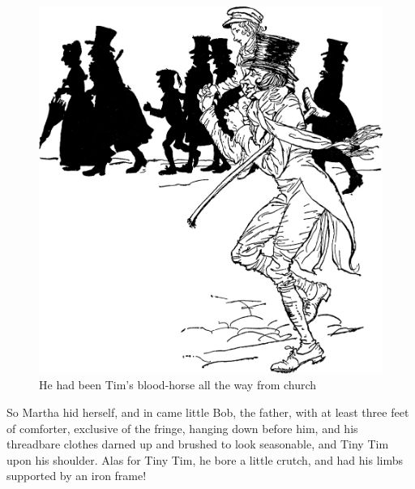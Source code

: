 \documentclass[paper=5.5in:8.5in,BCOR=7mm,twoside,DIV=calc,12pt,usegeometry]{scrbook} %
\begin{document}
\begin{figure}[th!]
\centering
\includegraphics[width=\linewidth]{bloodhorse2}
\caption*{He had been Tim's blood-horse all the way from church}
\end{figure}

So Martha hid herself, and in came little Bob, the father, with at least three feet of comforter, exclusive of the fringe, hanging down before him, and his threadbare clothes darned up and brushed to look seasonable, and Tiny Tim upon his shoulder. Alas for Tiny Tim, he bore a little crutch, and had his limbs supported by an iron frame!






\end{document}
